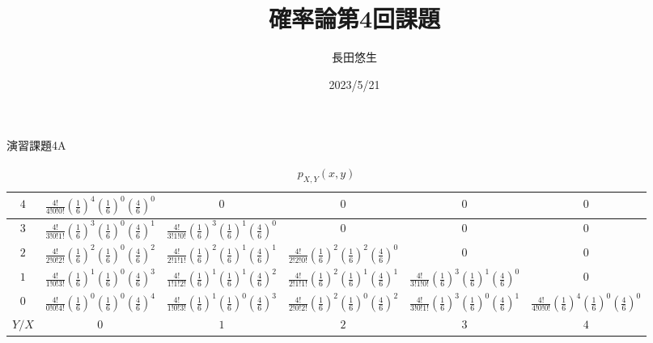 \documentclass[dvipdfmx,uplatex]{jsarticle}
\title{確率論第4回課題}
\author{長田悠生}
\date{2023/5/21}
\begin{document}
  \begin{titlepage}
    \maketitle
    \begin{center}
      \textmc{\HUGE \LaTeX}
    \end{center}
    \thispagestyle{empty}
  \end{titlepage}

    \centerline{\huge 演習課題4A}
    \vspace{10mm}
    \begin{table}[htb]
    \centering
        \caption{${p}_{X,Y}(x,y)$}
        \begin{tabular}{|c||c|c|c|c|c|} \hline
            $4$ & $\frac{4!}{4!0!0!} (\frac{1}{6})^4 (\frac{1}{6})^0 (\frac{4}{6})^0$ & $0$ & $0$ & $0$ & $0$ \\ \hline
            $3$ & $\frac{4!}{3!0!1!} (\frac{1}{6})^3 (\frac{1}{6})^0 (\frac{4}{6})^1$ & $\frac{4!}{3!1!0!} (\frac{1}{6})^3 (\frac{1}{6})^1 (\frac{4}{6})^0$ & $0$ & $0$ & $0$ \\ \hline
            $2$ & $\frac{4!}{2!0!2!} (\frac{1}{6})^2 (\frac{1}{6})^0 (\frac{4}{6})^2$ & $\frac{4!}{2!1!1!} (\frac{1}{6})^2 (\frac{1}{6})^1 (\frac{4}{6})^1$ & $\frac{4!}{2!2!0!} (\frac{1}{6})^2 (\frac{1}{6})^2 (\frac{4}{6})^0$ & $0$ & $0$ \\ \hline
            $1$ & $\frac{4!}{1!0!3!} (\frac{1}{6})^1 (\frac{1}{6})^0 (\frac{4}{6})^3$ & $\frac{4!}{1!1!2!} (\frac{1}{6})^1 (\frac{1}{6})^1 (\frac{4}{6})^2$ & $\frac{4!}{2!1!1!} (\frac{1}{6})^2 (\frac{1}{6})^1 (\frac{4}{6})^1$ & $\frac{4!}{3!1!0!} (\frac{1}{6})^3 (\frac{1}{6})^1 (\frac{4}{6})^0$ & $0$ \\ \hline
            $0$ & $\frac{4!}{0!0!4!} (\frac{1}{6})^0 (\frac{1}{6})^0 (\frac{4}{6})^4$ & $\frac{4!}{1!0!3!} (\frac{1}{6})^1 (\frac{1}{6})^0 (\frac{4}{6})^3$ & $\frac{4!}{2!0!2!} (\frac{1}{6})^2 (\frac{1}{6})^0 (\frac{4}{6})^2$ & $\frac{4!}{3!0!1!} (\frac{1}{6})^3 (\frac{1}{6})^0 (\frac{4}{6})^1$ & $\frac{4!}{4!0!0!} (\frac{1}{6})^4 (\frac{1}{6})^0 (\frac{4}{6})^0$ \\ \hline \hline
            $Y/X$ & $0$ & $1$ & $2$ & $3$ & $4$ \\ \hline
        \end{tabular}
    \end{table} \\
\end{document}
